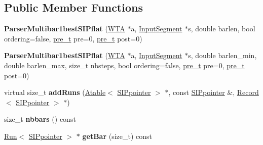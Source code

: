 \subsection*{Public Member Functions}
\begin{DoxyCompactItemize}
\item 
\mbox{\label{classParserMultibar1bestSIPflat_aab192b38f286fd10ebafc277476f0294}} 
{\bfseries Parser\+Multibar1best\+S\+I\+Pflat} (\mbox{\hyperlink{classWTA}{W\+TA}} $\ast$a, \mbox{\hyperlink{classInputSegment}{Input\+Segment}} $\ast$s, double barlen, bool ordering=false, \mbox{\hyperlink{group__general_ga092fe8b972dfa977c2a0886720a7731e}{pre\+\_\+t}} pre=0, \mbox{\hyperlink{group__general_ga092fe8b972dfa977c2a0886720a7731e}{pre\+\_\+t}} post=0)
\item 
\mbox{\label{classParserMultibar1bestSIPflat_acec74268bea7fde3f8c511699929c988}} 
{\bfseries Parser\+Multibar1best\+S\+I\+Pflat} (\mbox{\hyperlink{classWTA}{W\+TA}} $\ast$a, \mbox{\hyperlink{classInputSegment}{Input\+Segment}} $\ast$s, double barlen\+\_\+min, double barlen\+\_\+max, size\+\_\+t nbsteps, bool ordering=false, \mbox{\hyperlink{group__general_ga092fe8b972dfa977c2a0886720a7731e}{pre\+\_\+t}} pre=0, \mbox{\hyperlink{group__general_ga092fe8b972dfa977c2a0886720a7731e}{pre\+\_\+t}} post=0)
\item 
\mbox{\label{classParserMultibar1bestSIPflat_a728aaf750fd1d75839bd15444d8b9f20}} 
virtual size\+\_\+t {\bfseries add\+Runs} (\mbox{\hyperlink{classAtable}{Atable}}$<$ \mbox{\hyperlink{classSIPpointer}{S\+I\+Ppointer}} $>$ $\ast$, const \mbox{\hyperlink{classSIPpointer}{S\+I\+Ppointer}} \&, \mbox{\hyperlink{classRecord}{Record}}$<$ \mbox{\hyperlink{classSIPpointer}{S\+I\+Ppointer}} $>$ $\ast$)
\item 
\mbox{\label{classParserMultibar1bestSIPflat_acc7aa37e3fa4858b514405cdd4130c6e}} 
size\+\_\+t {\bfseries nbbars} () const
\item 
\mbox{\label{classParserMultibar1bestSIPflat_a77904b75a4b1938f86f511aea02f3f7d}} 
\mbox{\hyperlink{classRun}{Run}}$<$ \mbox{\hyperlink{classSIPpointer}{S\+I\+Ppointer}} $>$ $\ast$ {\bfseries get\+Bar} (size\+\_\+t) const
\item 

\end{DoxyCompactItemize}

